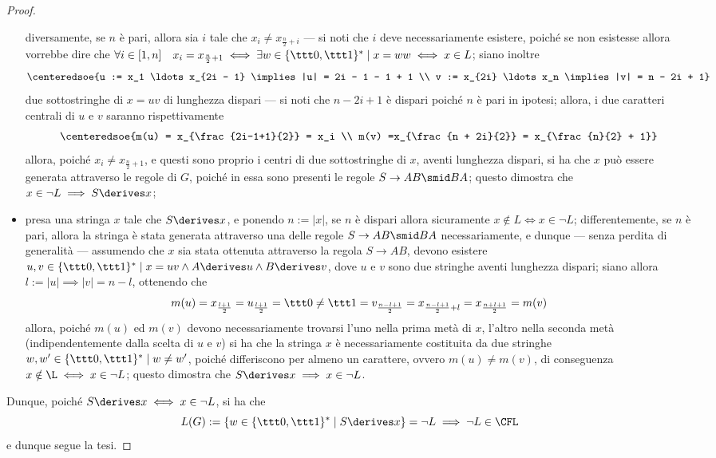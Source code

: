 \documentclass[a4paper, 12pt]{report}
\begin{document}
\begin{proof}
\begin{itemize}
                diversamente, se $n$ è pari, allora sia $i$ tale che $x_i \neq x_{\frac{n}{2} + i}$ --- si noti che $i$ deve necessariamente esistere, poiché se non esistesse allora vorrebbe dire che $\forall i \in [1, n] \quad x_i = x_{\frac{n}{2} + 1} \iff \exists w \in \{\ttt 0, \ttt 1\}^* \mid x = ww \iff x \in L$; siano inoltre $$\centeredsoe{u := x_1 \ldots x_{2i - 1} \implies |u| = 2i - 1 - 1 + 1 \\ v := x_{2i} \ldots x_n \implies |v| = n - 2i + 1}$$ due sottostringhe di $x = uv$ di lunghezza dispari --- si noti che $n - 2i + 1$ è dispari poiché $n$ è pari in ipotesi; allora, i due caratteri centrali di $u$ e $v$ saranno rispettivamente $$\centeredsoe{m(u) = x_{\frac{2i-1+1}{2}} = x_i \\ m(v) =x_{\frac{n + 2i}{2}} = x_{\frac{n}{2} + 1}}$$ allora, poiché $x_i \neq x_{\frac{n}{2} + 1}$, e questi sono proprio i centri di due sottostringhe di $x$, aventi lunghezza dispari, si ha che $x$ può essere generata attraverso le regole di $G$, poiché in essa sono presenti le regole $S \to AB \smid BA$; questo dimostra che $x \in \lnot L \implies S \derives x$;
            \item presa una stringa $x$ tale che $S \derives x$, e ponendo $n := |x|$, se $n$ è dispari allora sicuramente $x \notin L \iff x \in \lnot L$; differentemente, se $n$ è pari, allora la stringa è stata generata attraverso una delle regole $S \to AB \smid BA$ necessariamente, e dunque --- senza perdita di generalità --- assumendo che $x$ sia stata ottenuta attraverso la regola $S \to AB$, devono esistere $u, v \in \{\ttt 0, \ttt 1\}^* \mid x = uv \land A \derives u \land B \derives v$, dove $u$ e $v$ sono due stringhe aventi lunghezza dispari; siano allora $l := |u| \implies |v| = n - l$, ottenendo che $$m (u) = x_{\frac{l + 1}{2}} = u_{\frac{l + 1}{2}} = \ttt 0 \neq \ttt 1 = v_{\frac{n - l + 1}{2}} = x_{\frac{n - l + 1}{2} + l} = x_{\frac{n + l + 1}{2}} = m(v)$$ allora, poiché $m(u)$ ed $m(v)$ devono necessariamente trovarsi l'uno nella prima metà di $x$, l'altro nella seconda metà (indipendentemente dalla scelta di $u$ e $v$) si ha che la stringa $x$ è necessariamente costituita da due stringhe $w, w' \in \{\ttt 0, \ttt 1\}^* \mid w \neq w'$, poiché differiscono per almeno un carattere, ovvero $m(u) \neq m(v)$, di conseguenza $x \notin \L \iff x \in \lnot L$; questo dimostra che $S \derives x \implies x \in \lnot L$.
        \end{itemize}

        Dunque, poiché $S \derives x \iff x \in \lnot L$, si ha che $$L(G) := \{w \in \{\ttt 0, \ttt 1\}^* \mid S \derives x\} = \lnot L \implies \lnot L \in \mathrm{\CFL}$$ e dunque segue la tesi.
    \end{proof}
\end{document}
